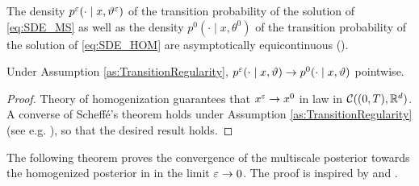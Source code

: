 \documentclass[10pt]{article}
\begin{document}
\begin{assumption}\label{as:TransitionRegularity} The density $p^\varepsilon(\cdot \mid x, \vartheta^\varepsilon)$ of the transition probability of the solution of \eqref{eq:SDE_MS} as well as the density $p^0(\cdot \mid x, \theta^0)$ of the transition probability of the solution of \eqref{eq:SDE_HOM} are asymptotically equicontinuous ().
\end{assumption}

\begin{lemma}\label{lem:TransitionConvergence} Under Assumption \ref{as:TransitionRegularity}, $p^\varepsilon(\cdot \mid x, \vartheta) \to p^0(\cdot \mid x, \vartheta)$ pointwise.
\end{lemma}
\begin{proof} Theory of homogenization guarantees that $x^\varepsilon \to x^0$ in law in $\mathcal C((0, T), \mathbb{R}^d)$. A converse of Scheffé's theorem holds under Assumption \ref{as:TransitionRegularity} (see e.g. \cite{Swe86, Boo85}), so that the desired result holds.
\end{proof}

The following theorem proves the convergence of the multiscale posterior towards the homogenized posterior in in the limit $\varepsilon \to 0$. The proof is inspired by \cite[Proposition 4.6]{Stu10} and \cite[Theorem 3.1]{LST18}.
\end{document}
